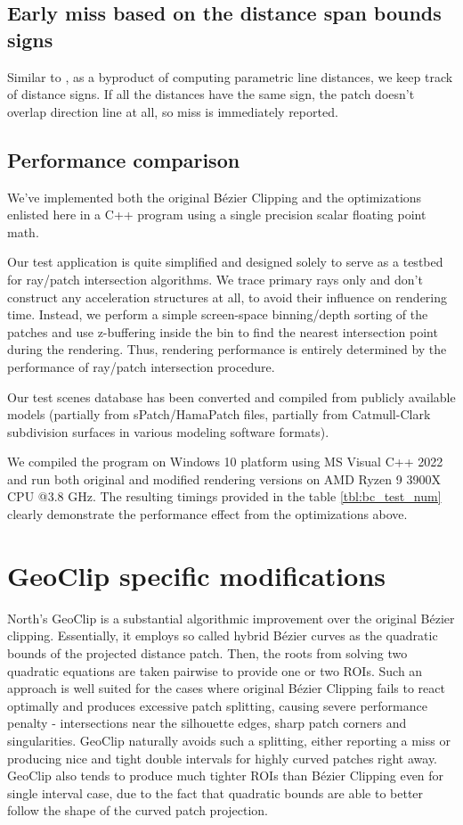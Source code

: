 \documentclass{jcgt}
\begin{document}
\subsection{Early miss based on the distance span bounds signs}
Similar to \cite{Tejima2015subdivision}, as a byproduct of computing parametric line distances, we keep track of distance signs. If all the distances have the same sign, the patch doesn’t overlap direction line at all, so miss is immediately reported.

\subsection{Performance comparison}
We've implemented both the original Bézier Clipping and the optimizations enlisted here in a C++ program using a single precision scalar floating point math.

Our test application is quite simplified and designed solely to serve as a testbed for ray/patch intersection algorithms. We trace primary rays only and don't construct any acceleration structures at all, to avoid their influence on rendering time. Instead, we perform a simple screen-space binning/depth sorting of the patches and use z-buffering inside the bin to find the nearest intersection point during the rendering. Thus, rendering performance is entirely determined by the performance of ray/patch intersection procedure.

Our test scenes database has been converted and compiled from publicly available models (partially from sPatch/HamaPatch files, partially from Catmull-Clark subdivision surfaces in various modeling software formats).

We compiled the program on Windows 10 platform using MS Visual C++ 2022 and run both original and modified rendering versions on AMD Ryzen 9 3900X CPU @3.8 GHz. The resulting timings provided in the table \ref{tbl:bc_test_num} clearly demonstrate the performance effect from the optimizations above.


\section{GeoClip specific modifications}
North's GeoClip is a substantial algorithmic improvement over the original Bézier clipping. Essentially, it employs so called hybrid Bézier curves as the quadratic bounds of the projected distance patch. Then, the roots from solving two quadratic equations are taken pairwise to provide one or two ROIs. Such an approach is well suited for the cases where original Bézier Clipping fails to react optimally and produces excessive patch splitting, causing severe performance penalty - intersections near the silhouette edges, sharp patch corners and singularities. GeoClip naturally avoids such a splitting, either reporting a miss or producing nice and tight double intervals for highly curved patches right away. GeoClip also tends to produce much tighter ROIs than Bézier Clipping even for single interval case, due to the fact that quadratic bounds are able to better follow the shape of the curved patch projection.
\end{document}
